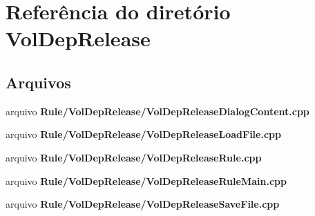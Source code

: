\section{Referência do diretório Vol\+Dep\+Release}
\label{dir_c200b21676c111b40a589bede135dfcd}
\subsection*{Arquivos}
\begin{DoxyCompactItemize}
\item 
arquivo {\bf Rule/\+Vol\+Dep\+Release/\+Vol\+Dep\+Release\+Dialog\+Content.\+cpp}
\item 
arquivo {\bf Rule/\+Vol\+Dep\+Release/\+Vol\+Dep\+Release\+Load\+File.\+cpp}
\item 
arquivo {\bf Rule/\+Vol\+Dep\+Release/\+Vol\+Dep\+Release\+Rule.\+cpp}
\item 
arquivo {\bf Rule/\+Vol\+Dep\+Release/\+Vol\+Dep\+Release\+Rule\+Main.\+cpp}
\item 
arquivo {\bf Rule/\+Vol\+Dep\+Release/\+Vol\+Dep\+Release\+Save\+File.\+cpp}
\end{DoxyCompactItemize}
